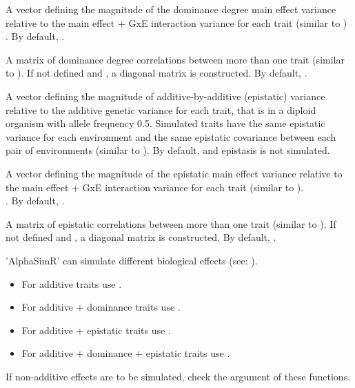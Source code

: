 \documentclass[a4paper]{book}
\begin{document}
\begin{Arguments}
\begin{ldescription}
\item[\code{rel\_main\_eff\_DD}] A vector defining the magnitude of the dominance degree main effect
variance relative to the main effect + GxE interaction variance for each trait (similar to
) \\{}
 . By default, .

\item[\code{cor\_DD}] A matrix of dominance degree correlations between more than one trait (similar
to ). If not defined and , a diagonal matrix is constructed.
By default, .

\item[\code{rel\_AA}] A vector defining the magnitude of additive-by-additive (epistatic) variance
relative to the additive genetic variance for each trait, that is in a diploid organism with
allele frequency 0.5. Simulated traits have the same epistatic variance for each environment
and the same epistatic covariance between each pair of environments (similar to ).
By default,  and epistasis is not simulated.

\item[\code{rel\_main\_eff\_AA}] A vector defining the magnitude of the epistatic main effect variance
relative to the main effect + GxE interaction variance for each trait (similar to
). \\{}
 . By default, .

\item[\code{cor\_AA}] A matrix of epistatic correlations between more than one trait (similar to
). If not defined and , a diagonal matrix is constructed. By
default, .
\end{ldescription}
\end{Arguments}
%
\begin{Details}\relax
{} 'AlphaSimR' can simulate different biological effects (see:
).
\begin{itemize}

\item{} For additive traits use .
\item{} For additive + dominance traits use .
\item{} For additive + epistatic traits use .
\item{} For additive + dominance + epistatic traits use .

\end{itemize}

If non-additive effects are to be simulated, check the  argument of these
functions.
\end{Details}
\end{document}
